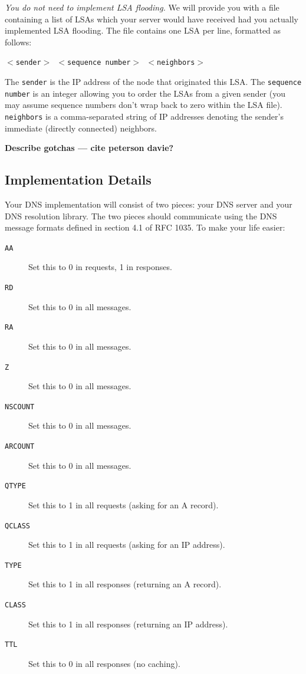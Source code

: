 \documentclass{article}
\begin{document}
\emph{You do not need to implement LSA flooding.} We will provide you with a
file containing a list of LSAs which your server would have received had you
actually implemented LSA flooding.  The file contains one LSA per line,
formatted as follows:
\begin{center}
	\texttt{$<$sender$>$ $<$sequence number$>$ $<$neighbors$>$}
\end{center}
The \texttt{sender} is the IP address of the node that originated this LSA. The
\texttt{sequence number} is an integer allowing you to order the LSAs from a
given sender (you may assume sequence numbers don't wrap back to zero within
the LSA file). \texttt{neighbors} is a comma-separated string of IP addresses
denoting the sender's immediate (directly connected) neighbors.

\textbf{Describe gotchas --- cite peterson
davie?} 


\subsection{Implementation Details}
\label{sec:dns-details}

Your DNS implementation will consist of two pieces: your DNS server and your
DNS resolution library. The two pieces should communicate using the DNS message
formats defined in section 4.1 of RFC 1035. To make your life easier:

\begin{description}
	\item[\texttt{AA}] Set this to 0 in requests, 1 in responses.
	\item[\texttt{RD}] Set this to 0 in all messages.
	\item[\texttt{RA}] Set this to 0 in all messages.
	\item[\texttt{Z}] Set this to 0 in all messages.
	\item[\texttt{NSCOUNT}] Set this to 0 in all messages.
	\item[\texttt{ARCOUNT}] Set this to 0 in all messages.
	\item[\texttt{QTYPE}] Set this to 1 in all requests (asking for an A record).
	\item[\texttt{QCLASS}] Set this to 1 in all requests (asking for an IP address).
	\item[\texttt{TYPE}] Set this to 1 in all responses (returning an A record).
	\item[\texttt{CLASS}] Set this to 1 in all responses (returning an IP address).
	\item[\texttt{TTL}] Set this to 0 in all responses (no caching).
\end{description}
\end{document}
